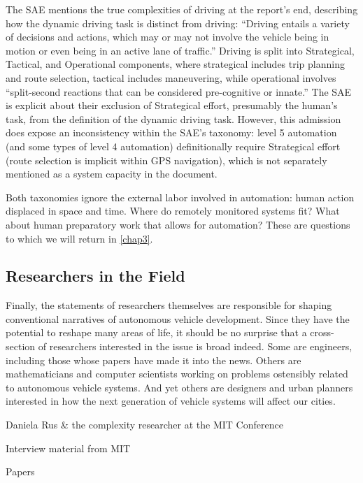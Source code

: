 The SAE mentions the true complexities of driving at the report's end,
describing how the dynamic driving task is distinct from driving:
``Driving entails a variety of decisions and actions, which may or may
not involve the vehicle being in motion or even being in an active
lane of traffic.''\cite{???} Driving is split into Strategical, Tactical, and
Operational components, where strategical includes trip planning and
route selection, tactical includes maneuvering, while operational
involves ``split-second reactions that can be considered pre-cognitive
or innate.''\cite{???} The SAE is explicit about their exclusion of Strategical
effort, presumably the human's task, from the definition of the
dynamic driving task. However, this admission does expose an
inconsistency within the SAE's taxonomy: level 5 automation (and some
types of level 4 automation) definitionally require Strategical effort
(route selection is implicit within GPS navigation), which is not
separately mentioned as a system capacity in the document.

Both taxonomies ignore the external labor involved in automation:
human action displaced in space and time. Where do remotely monitored
systems fit? What about human preparatory work that allows for
automation? These are questions to which we will return in \ref{chap3}.

\subsection{Researchers in the Field}

Finally, the statements of researchers themselves are responsible for
shaping conventional narratives of autonomous vehicle development.
Since they have the potential to reshape many areas of life, it should
be no surprise that a cross-section of researchers interested in the
issue is broad indeed. Some are engineers, including those whose
papers have made it into the news. Others are mathematicians and
computer scientists working on problems ostensibly related to
autonomous vehicle systems. And yet others are designers and urban
planners interested in how the next generation of vehicle systems will
affect our cities.

Daniela Rus & the complexity researcher at the MIT Conference

Interview material from MIT

Papers



